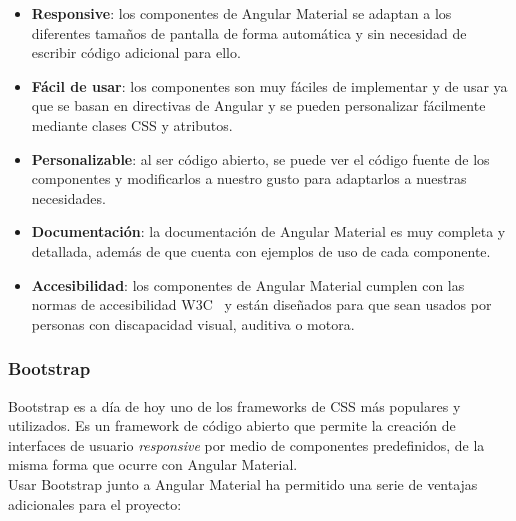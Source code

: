 \begin{itemize}
    \item \textbf{Responsive}: los componentes de Angular Material se adaptan a los diferentes tamaños de pantalla
    de forma automática y sin necesidad de escribir código adicional para ello.
    \item \textbf{Fácil de usar}: los componentes son muy fáciles de implementar y de usar ya que se basan en
    directivas de Angular y se pueden personalizar fácilmente mediante clases CSS y atributos.
    \item \textbf{Personalizable}: al ser código abierto, se puede ver el código fuente de los componentes y
    modificarlos a nuestro gusto para adaptarlos a nuestras necesidades.
    \item \textbf{Documentación}: la documentación de Angular Material es muy completa y detallada, además
    de que cuenta con ejemplos de uso de cada componente.
    \item \textbf{Accesibilidad}: los componentes de Angular Material cumplen con las normas de accesibilidad W3C~\cite{W3C} y
    están diseñados para que sean usados por personas con discapacidad visual, auditiva o motora.
\end{itemize}

\subsubsection{Bootstrap}\label{subsubsec:bootstrap}

Bootstrap es a día de hoy uno de los frameworks de CSS más populares y utilizados. Es un framework de código abierto
que permite la creación de interfaces de usuario \textit{responsive} por medio de componentes predefinidos, de
la misma forma que ocurre con Angular Material. \\

Usar Bootstrap junto a Angular Material ha permitido una serie de ventajas adicionales para el proyecto:

